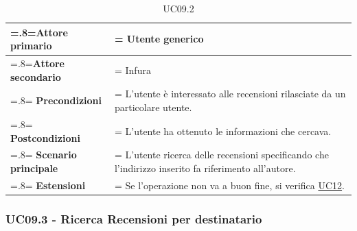             \begin{table}[H]
                \centering
                \renewcommand{\arraystretch}{1.8}
                \renewcommand\tabularxcolumn[1]{m{#1}}
                \begin{tabularx}{0.9\textwidth} {
                    >{\hsize=.8\hsize\linewidth=\hsize}X
                    >{\hsize=1.2\hsize\linewidth=\hsize}X}
                    \hline
                    \textbf{Attore primario} & Utente generico \\
                    \hline
                    \textbf{Attore secondario} & Infura \\
                    \hline
                    \textbf{Precondizioni} & L'utente è interessato alle recensioni rilasciate da un particolare utente. \\
                    \hline
                    \textbf{Postcondizioni} & L'utente ha ottenuto le informazioni che cercava. \\
                    \hline
                    \textbf{Scenario principale} & L'utente ricerca delle recensioni specificando che l'indirizzo inserito fa riferimento all'autore.\\
                    \hline
                    \textbf{Estensioni} & Se l'operazione non va a buon fine, si verifica \hyperref[UC12]{UC12}. \\
                    \hline
                \end{tabularx}
                \caption{UC09.2}
            \end{table}

        \subsubsection{UC09.3 - Ricerca Recensioni per destinatario}
        \label{UC09.3}

